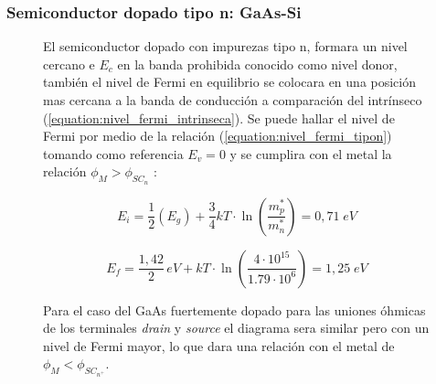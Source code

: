 \documentclass[a4paper]{article}
\begin{document}
\subsubsection{Semiconductor dopado tipo n: GaAs-Si}

\begin{figure}[H]
	\begin{minipage}[c]{0.45\textwidth}
		
		El semiconductor dopado con impurezas tipo n, formara un nivel cercano e $E_c$ en la banda prohibida conocido como nivel donor, también el nivel de Fermi en equilibrio se colocara en una posición mas cercana a la banda de conducción a comparación del intrínseco (\ref{equation:nivel_fermi_intrinseca}). Se puede hallar el nivel de Fermi por medio de la relación (\ref{equation:nivel_fermi_tipon}) tomando como referencia $E_v = 0$ y se cumplira con el metal la relación $\phi_M > \phi_{SC_{n}}$ :
		
		\begin{equation}\label{equation:nivel_fermi_intrinseca}
			E_i =  \frac{1}{2}\left(E_g\right) + \frac{3}{4} k T \cdot \ln\left(\frac{m_p^{*}}{m_n^{*}}\right) = 0,71 \; eV
		\end{equation}
		
		\begin{equation}\label{equation:nivel_fermi_tipon}
			E_f = \frac{1,42}{2}\, eV + kT\cdot \ln\!\left(\frac{4\cdot 10^{15}}{1.79\cdot 10^{6}}\right) = 1,25 \; eV
		\end{equation}
	
		Para el caso del GaAs fuertemente dopado para las uniones óhmicas de los terminales \textit{drain} y \textit{source} el diagrama sera similar pero con un nivel de Fermi mayor, lo que dara una relación con el metal de $\phi_M < \phi_{SC_{n^+}}$. 
		
		 
	\end{minipage}
	\hfill
	\begin{minipage}[c]{0.5\textwidth}
		\centering
\end{minipage}
\end{figure}
\end{document}
